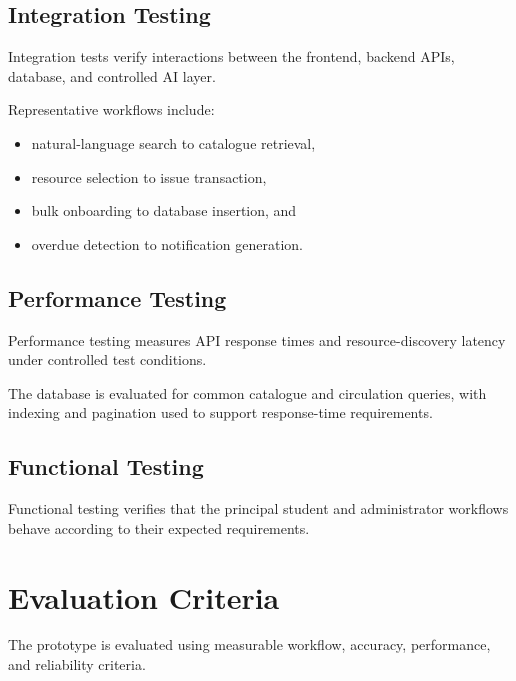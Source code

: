 \documentclass{tietreport}
\begin{document}
\subsection{Integration Testing}

Integration tests verify interactions between the frontend, backend APIs,
database, and controlled AI layer.

Representative workflows include:

\begin{itemize}

    \item natural-language search to catalogue retrieval,

    \item resource selection to issue transaction,

    \item bulk onboarding to database insertion, and

    \item overdue detection to notification generation.

\end{itemize}

\subsection{Performance Testing}

Performance testing measures API response times and resource-discovery
latency under controlled test conditions.

The database is evaluated for common catalogue and circulation queries,
with indexing and pagination used to support response-time requirements.

\subsection{Functional Testing}

Functional testing verifies that the principal student and administrator
workflows behave according to their expected requirements.


\section{Evaluation Criteria}

The prototype is evaluated using measurable workflow, accuracy,
performance, and reliability criteria.
\end{document}
